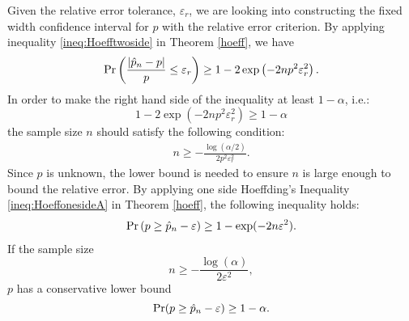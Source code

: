 \documentclass{iitthesis}
\theoremstyle{definition}
\begin{document}

Given the relative error tolerance, $\varepsilon_r$, we are looking into constructing the fixed width confidence interval for $p$ with the relative error criterion. By applying inequality \eqref{ineq:Hoefftwoside} in Theorem \ref{hoeff}, we have
\begin{align*}
\Pr\left(\frac{|\hat{p}_n-p|}{p} \leq \varepsilon_r\right) \geq 1-2\exp\left(-2np^2\varepsilon_r^2\right).
\end{align*}
In order to make the right hand side of the inequality at least $1-\alpha$, i.e.:
$$1-2\exp\left(-2np^2\varepsilon_r^2\right) \geq 1-\alpha$$
the sample size $n$ should satisfy the following condition: 
\begin{align*}
n \geq -\frac{\log (\alpha/2)}{2 p^2 \varepsilon_r^2}.
\end{align*}
Since $p$ is unknown, the lower bound is needed to ensure $n$ is large enough to bound the relative error. By applying one side Hoeffding's Inequality \eqref{ineq:HoeffonesideA} in Theorem \ref{hoeff}, the following inequality holds:
\begin{align}\label{onesidehoeffn}
\Pr\left(p \geq \hat{p}_n-\varepsilon \right) \geq 1- \exp(-2n\varepsilon^2).
\end{align}
If the sample size 
$$n \geq -\frac{\log(\alpha)} {2\varepsilon^2 },$$
$p$ has a conservative lower bound $$\Pr(p \geq \hat{p}_n-\varepsilon)\geq1-\alpha.$$
\end{document}
